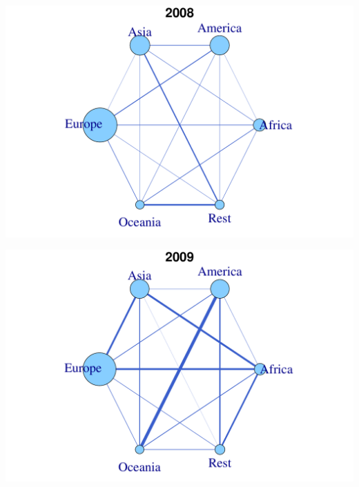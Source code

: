 \documentclass[a4paper,ngerman,oneside,titlepage,bibliography=totoc,11pt]{scrreprt}
\begin{document}
\begin{minipage}[t]{0.48\textwidth}
		\centering
			\includegraphics[width=1\textwidth]{Grafiken/Cont_Ani/cont17.pdf}
\end{minipage}	
\hfill	
\begin{minipage}[t]{0.48\textwidth}	
			\centering
			\includegraphics[width=1\textwidth]{Grafiken/Cont_Ani/cont18.pdf}
\end{minipage}
\end{document}
